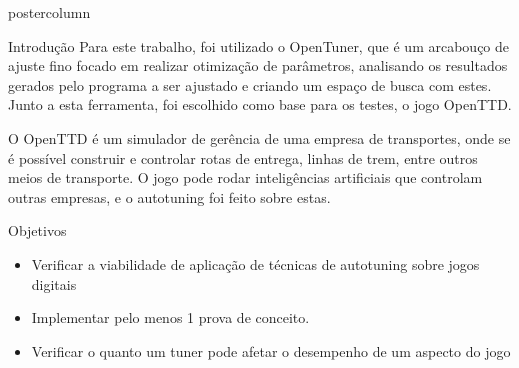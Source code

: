 \documentclass[final]{beamer}
\begin{document}
\begin{frame}
\begin{columns}
\begin{column}{.5\textwidth}
\begin{beamercolorbox}[center,wd=\textwidth]{postercolumn}
\begin{minipage}[T]{.95\textwidth}
{\begin{block}{Introdução}
                Para este trabalho, foi utilizado o OpenTuner, que é um arcabouço de ajuste fino focado em realizar otimização de parâmetros, analisando os resultados gerados pelo programa a ser ajustado e criando um espaço de busca com estes. Junto a esta ferramenta, foi escolhido como base para os testes, o jogo OpenTTD.
                
                \vspace*{0.15cm}
                
                O OpenTTD é um simulador de gerência de uma empresa de transportes, onde se é possível construir e controlar rotas de entrega, linhas de trem, entre outros meios de transporte. O jogo pode rodar inteligências artificiais que controlam outras empresas, e o autotuning foi feito sobre estas.

                
            \end{block}
            
            \vspace*{0.2cm}

            \begin{block}{Objetivos}
              \justifying
              \begin{itemize}
                \item Verificar a viabilidade de aplicação de técnicas de autotuning sobre jogos digitais 
                
                \vspace*{0.4cm}
                
                \item Implementar pelo menos 1 prova de conceito.
                
                \vspace*{0.4cm}
                
                \item Verificar o quanto um tuner pode afetar o desempenho de um aspecto do jogo 
              \end{itemize}
              \vspace*{0.2cm} 
            \end{block}
            
            \vspace*{0.2cm}
            
}
\end{minipage}
\end{beamercolorbox}
\end{column}
\end{columns}
\end{frame}
\end{document}
